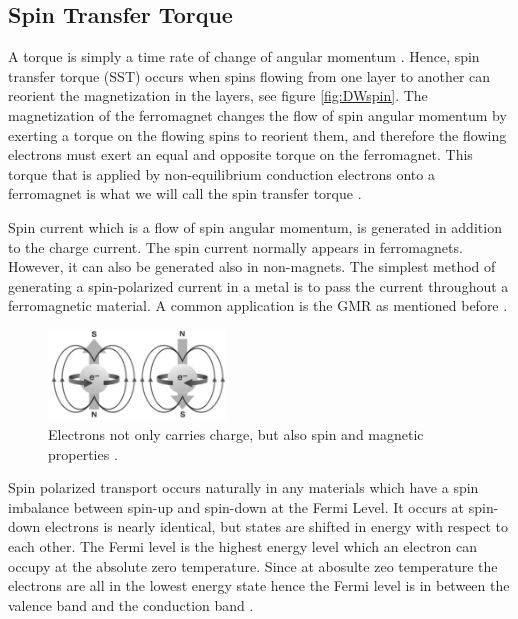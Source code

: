 \subsection{Spin Transfer Torque }

A torque is simply a time rate of change of angular momentum \cite{spintransfer}. Hence, spin transfer torque (SST) occurs when spins flowing from one layer to another can reorient the magnetization in the layers, see figure \ref{fig:DWspin}. The magnetization of the ferromagnet changes the flow of spin angular momentum by exerting a torque on the flowing spins to reorient them, and therefore the flowing electrons must exert an equal and opposite torque on the ferromagnet. This torque that is applied by non-equilibrium conduction electrons onto a ferromagnet is what we will call the spin transfer torque \cite{spintransfer}.

Spin current which is a flow of spin angular momentum, is generated in addition to the charge current. The spin current normally appears in ferromagnets. However, it can also be generated also in non-magnets. The simplest method of generating a spin-polarized current in a metal is to pass the current throughout a ferromagnetic material. A common application is the GMR as mentioned before \cite{handbookspin}.

\begin{figure}[htbp]
	\centering
		\includegraphics[width=0.42\textwidth]{Figures/electron.png}
		\smallskip
	\caption[Electron carries spin, charge and magnetic]{Electrons not only carries charge, but also spin and magnetic properties \cite{spinimg}. }
	\label{fig:electron}
\end{figure}


Spin polarized transport occurs naturally in any materials which have a spin imbalance between spin-up and spin-down at the Fermi Level. It occurs at spin-down electrons is nearly identical, but states are shifted in energy with respect to each other. The Fermi level is the highest energy level which an electron can occupy at the absolute zero temperature. Since at abosulte zeo temperature the electrons are all in the lowest energy state hence the Fermi level is in between the valence band and the conduction band \cite{handbookspin}.

